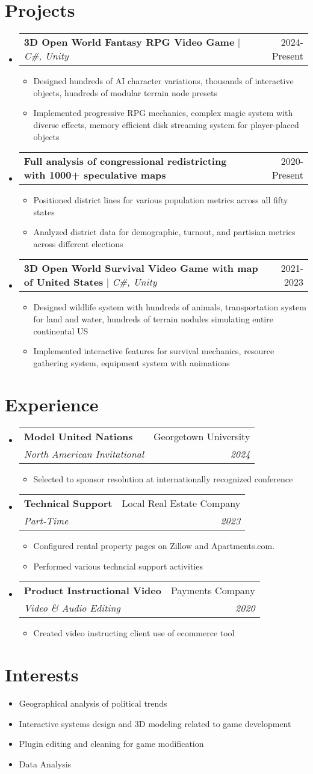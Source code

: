 \documentclass[letterpaper,11pt]{article}
\makeatletter
\newcommand{\resumeItem}[1]{ 
  \item\small{\parbox[t]{0.8\textwidth}{#1} \vspace{-2pt}} 
  }
\newcommand{\resumeItemLongLines}[1]{ 
  \item\small{\parbox[t]{0.8\textwidth}{#1} \vspace{2pt}} 
  }
\newcommand{\resumeSubheading}[4]{ 
  \vspace{-2pt}\item 
  \begin{tabular*}{0.97\textwidth}[t]{l@{\extracolsep{\fill}}r} 
    \textbf{#1} & #2 \\ 
    \textit{\small#3} & \textit{\small #4} \\ 
  \end{tabular*}\vspace{-7pt} 
}
\newcommand{\resumeProjectHeading}[2]{ 
  \item 
  \begin{tabular*}{0.97\textwidth}[t]{l@{\extracolsep{\fill}}r} 
    \small#1 & #2 \\ 
  \end{tabular*}\vspace{-7pt} 
}
\newcommand{\resumeSubHeadingListStart}{\begin{itemize}[leftmargin=0.15in, label={}]}
\newcommand{\resumeSubHeadingListEnd}{\end{itemize}}
\newcommand{\resumeItemListStart}{\begin{itemize}[leftmargin=0.15in, label={}]}
\newcommand{\resumeItemListEnd}{\end{itemize}\vspace{-5pt}}
\makeatother
\begin{document}
\section{Projects} 
  \resumeSubHeadingListStart 
    \resumeProjectHeading 
      {\textbf{3D Open World Fantasy RPG Video Game} $|$ \emph{C\#, Unity}}{2024-Present} 
      \resumeItemListStart 
        \resumeItemLongLines{Designed hundreds of AI character variations, thousands of interactive objects, hundreds of modular terrain node presets} 
        \resumeItem{Implemented progressive RPG mechanics, complex magic system with diverse effects, memory efficient disk streaming system for player-placed objects} 
      \resumeItemListEnd 
    \resumeProjectHeading 
      {\textbf{Full analysis of congressional redistricting with 1000+ speculative maps} \emph{}}{2020-Present} 
      \resumeItemListStart 
        \resumeItemLongLines{Positioned district lines for various population metrics across all fifty states} 
        \resumeItem{Analyzed district data for demographic, turnout, and partisian metrics across different elections} 
      \resumeItemListEnd 
    \resumeProjectHeading 
      {\textbf{3D Open World Survival Video Game with map of United States} $|$ \emph{C\#, Unity}}{2021-2023} 
      \resumeItemListStart 
        \resumeItemLongLines{Designed wildlife system with hundreds of animals, transportation system for land and water, hundreds of terrain nodules simulating entire continental US} 
        \resumeItem{Implemented interactive features for survival mechanics, resource gathering system, equipment system with animations} 
      \resumeItemListEnd 
  \resumeSubHeadingListEnd 

\section{Experience} 
  \resumeSubHeadingListStart 
    \resumeSubheading 
      {Model United Nations}{Georgetown University} 
      {North American Invitational}{2024} 
      \resumeItemListStart 
        \resumeItem{Selected to sponsor resolution at internationally recognized conference} 
      \resumeItemListEnd 
    \resumeSubheading 
      {Technical Support}{Local Real Estate Company} 
      {Part-Time}{2023} 
      \resumeItemListStart 
        \resumeItem{Configured rental property pages on Zillow and Apartments.com. } 
        \resumeItem{Performed various techncial support activities} 
      \resumeItemListEnd 
    \resumeSubheading 
      {Product Instructional Video}{Payments Company} 
      {Video \& Audio Editing}{2020} 
      \resumeItemListStart 
        \resumeItem{Created video instructing client use of ecommerce tool} 
      \resumeItemListEnd 
  \resumeSubHeadingListEnd 

\section{Interests} 
  \resumeItemListStart 
    \resumeItem{Geographical analysis of political trends} 
    \resumeItem{Interactive systems design and 3D modeling related to game development} 
    \resumeItem{Plugin editing and cleaning for game modification} 
    \resumeItem{Data Analysis} 
  \resumeItemListEnd 
\end{document}
